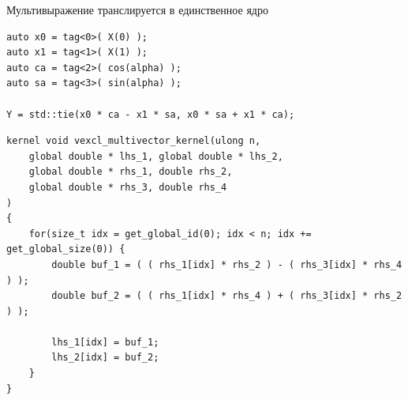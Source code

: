 \documentclass[@BEAMER_OPTIONS@]{beamer}
\begin{document}
\begin{frame}[fragile,shrink=5]{Мультивыражение транслируется в единственное
    ядро}
    \begin{exampleblock}{}
        \begin{lstlisting}
auto x0 = tag<0>( X(0) );
auto x1 = tag<1>( X(1) );
auto ca = tag<2>( cos(alpha) );
auto sa = tag<3>( sin(alpha) );

Y = std::tie(x0 * ca - x1 * sa, x0 * sa + x1 * ca);
        \end{lstlisting}
    \end{exampleblock}
    \begin{exampleblock}{}
        \begin{lstlisting}
kernel void vexcl_multivector_kernel(ulong n,
    global double * lhs_1, global double * lhs_2,
    global double * rhs_1, double rhs_2,
    global double * rhs_3, double rhs_4
)
{
    for(size_t idx = get_global_id(0); idx < n; idx += get_global_size(0)) {
        double buf_1 = ( ( rhs_1[idx] * rhs_2 ) - ( rhs_3[idx] * rhs_4 ) );
        double buf_2 = ( ( rhs_1[idx] * rhs_4 ) + ( rhs_3[idx] * rhs_2 ) );

        lhs_1[idx] = buf_1;
        lhs_2[idx] = buf_2;
    }
}

        \end{lstlisting}
    \end{exampleblock}
\end{frame}

\note{ }
\end{document}
